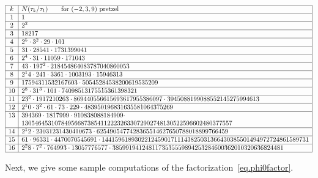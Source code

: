 \documentclass[12pt]{amsart}
\theoremstyle{definition}
\def\be{  \begin{equation} }
\def\ee{  \end{equation} }
\begin{document}
{\tiny
\be
\label{t.239norm}
\begin{array}{|c|l|} \hline
k & N(\tau_k/\tau_1) \qquad \text{for $(-2,3,9)$ pretzel} \\ \hline
1 & 1 \\ \hline
2 & 2^2 \\ \hline
3 & 18217 \\ \hline
4 & 2^5 \cdot 3^2 \cdot 29 \cdot 101 \\ \hline
5 & 31 \cdot 28541 \cdot 1731399041 \\ \hline
6 & 2^4 \cdot 31 \cdot 11059 \cdot 171043 \\ \hline
7 & 43 \cdot 197^2 \cdot 218454864083787040860053 \\ \hline
8 & 2^14 \cdot 241 \cdot 3361 \cdot 1003193 \cdot 15946313 \\ \hline
9 & 17594311532167603 \cdot 50545284538200619535209 \\ \hline
10 & 2^8 \cdot 31^3 \cdot 101 \cdot 74098513175515361398321 \\ \hline
11 & 23^2 \cdot 1917210263 \cdot 869440556615693617955386097 \cdot 
     3945088199088552145275994613 \\ \hline
12 & 2^10 \cdot 3^2 \cdot 61 \cdot 73 \cdot 229 \cdot 
483950196831635581064375269 \\ \hline
13 & 394369 \cdot 1817999 \cdot 910838088184909 \cdot \\ &
     1305464531078495668738541122232633072902748130522596602480377557 \\ \hline
14 & 2^12 \cdot 23031231430410673 \cdot 6254905477428365514627650788018899766459 \\ \hline
15 & 61 \cdot 96331 \cdot 4470070545691 \cdot 
     144159618930221245901711143825031366430385501494972724861589731 \\ \hline
16 & 2^28 \cdot 7^2 \cdot 764993 \cdot 13057776577 \cdot 
     3859919412481173535559894253284600362010320636824481
\\ \hline
\end{array}
\ee
}

Next, we give some sample computations of the 
factorization~\eqref{eq.phi0factor}. 
\end{document}
